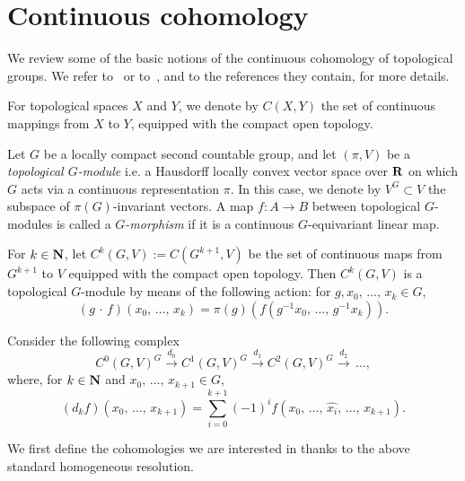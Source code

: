 \section{Continuous cohomology}\label{2}

We review some of the basic notions of the continuous cohomology of topological groups. We refer to~\cite[Chapter~IX]{BW} or to~\cite{Gui}, and to the references they contain, for more details.

For topological spaces $X$ and $Y$, we denote by $C(X,Y)$ the set of continuous mappings from $X$ to $Y$, equipped with the compact open topology.

Let $G$ be a locally compact second countable group, and let $(\pi, V)$ be a \emph{topological $G$-module} i.e. a Hausdorff locally convex vector space over ${\bf R}$ on which $G$ acts via a continuous representation $\pi$. In this case, we denote by $V^G \subset V$ the subspace of $\pi(G)$-invariant vectors. A map $f: A \to B$ between topological $G$-modules is called a \emph{$G$-morphism} if it is a continuous $G$-equivariant linear map.


For $k \in {\bf N}$, let $C^k (G, V):= C(G^{k+1}, V)$ be the set of continuous maps from $G^{k+1}$ to $V$ equipped with the compact open topology. Then $C^k (G,V)$ is a topological $G$-module by means of the following action: for $g, x_0,\,\dots,\,x_k \in G$,
\[
(g\,\cdot\,f) (x_0,\,\dots,\,x_k) = \pi(g) \left(f\left(g ^{-1} x_0,\,\dots,\,g^{-1} x_k\right)\right).
\]

Consider the following complex
\[
C^0(G,V)^G \stackrel{d_0}{\to} C^1(G,V)^G \stackrel{d_1}{\to} C^2(G,V)^G \stackrel{d_2}{\to}\,\dots,
\]
where, for $k \in {\bf N}$ and $x_0,\,\dots,\,x_{k+1} \in G$,
\begin{equation}\label{differential}
(d _k f)(x_0,\,\dots,\,x_{k+1}) = \sum _{i =0} ^{k+1} (-1)^{i} f(x_0,\,\dots,\,\hat{x_i},\,\dots,\,x_{k+1}).
\end{equation}

We first define the cohomologies we are interested in thanks to the above standard homogeneous resolution.

